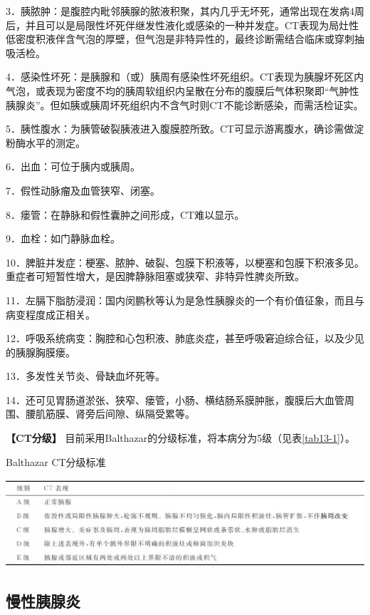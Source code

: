 3．胰脓肿：是腹腔内毗邻胰腺的脓液积聚，其内几乎无坏死，通常出现在发病4周后，并且可以是局限性坏死伴继发性液化或感染的一种并发症。CT表现为局灶性低密度积液伴含气泡的厚壁，但气泡是非特异性的，最终诊断需结合临床或穿刺抽吸活检。

4．感染性坏死：是胰腺和（或）胰周有感染性坏死组织。CT表现为胰腺坏死区内气泡，或表现为密度不均的胰周软组织内呈散在分布的腹膜后气体积聚即“气肿性胰腺炎”。但如胰或胰周坏死组织内不含气时则CT不能诊断感染，而需活检证实。

5．胰性腹水：为胰管破裂胰液进入腹膜腔所致。CT可显示游离腹水，确诊需做淀粉酶水平的测定。

6．出血：可位于胰内或胰周。

7．假性动脉瘤及血管狭窄、闭塞。

8．瘘管：在静脉和假性囊肿之间形成，CT难以显示。

9．血栓：如门静脉血栓。

10．脾脏并发症：梗塞、脓肿、破裂、包膜下积液等，以梗塞和包膜下积液多见。重症者可短暂性增大，是因脾静脉阻塞或狭窄、非特异性脾炎所致。

11．左膈下脂肪浸润：国内闵鹏秋等认为是急性胰腺炎的一个有价值征象，而且与病变程度成正相关。

12．呼吸系统病变：胸腔和心包积液、肺底炎症，甚至呼吸窘迫综合征，以及少见的胰腺胸膜瘘。

13．多发性关节炎、骨缺血坏死等。

14．还可见胃肠道淤张、狭窄、瘘管，小肠、横结肠系膜肿胀，腹膜后大血管周围、腰肌筋膜、肾旁后间隙、纵隔受累等。

\textbf{【CT分级】}
目前采用Balthazar的分级标准，将本病分为5级（见表\ref{tab13-1}）。

\begin{table}[htbp]
\centering
\caption{Balthazar CT分级标准}
\label{tab13-1}
\includegraphics[width=\textwidth,height=\textheight,keepaspectratio]{./images/Image00301.jpg}
\end{table}

\subsection{慢性胰腺炎}

